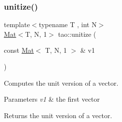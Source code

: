 \subsubsection{\texorpdfstring{unitize()}{unitize()}}
{\footnotesize\ttfamily template$<$typename T , int N$>$ \\
\mbox{\hyperlink{classtao_1_1_mat}{Mat}}$<$T, N, 1$>$ tao\+::unitize (\begin{DoxyParamCaption}\item[{const \mbox{\hyperlink{classtao_1_1_mat}{Mat}}$<$ T, N, 1 $>$ \&}]{v1 }\end{DoxyParamCaption})}



Computes the unit version of a vector. 


\begin{DoxyParams}{Parameters}
{\em v1} & the first vector \\
\hline
\end{DoxyParams}
\begin{DoxyReturn}{Returns}
the unit version of a vector. 
\end{DoxyReturn}
